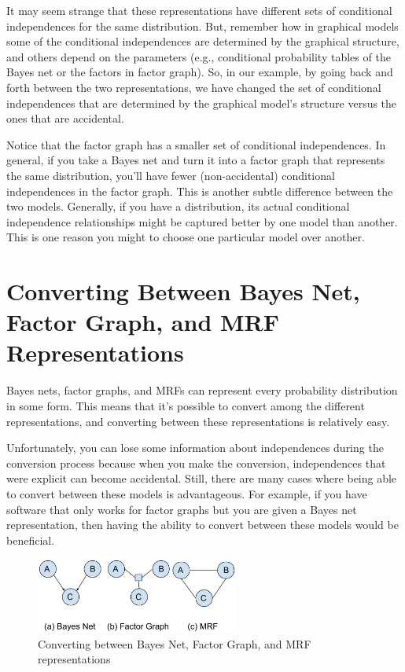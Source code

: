 \documentclass[twoside]{article}
\begin{document}
It may seem strange that these representations have different sets of conditional independences for the same
distribution.
But, remember how in graphical models some of the conditional independences are determined
by the graphical structure, and others depend on the parameters (e.g., conditional probability tables of the Bayes net
or the factors in factor graph).
So, in our example, by going back and forth between the two representations, we have changed the set of 
conditional independences that are determined by the graphical model's structure versus the ones that are accidental.

Notice that the factor graph has a smaller set of conditional independences.
In general, if you take a Bayes net and turn it into a factor graph that represents the same distribution,
you'll have fewer (non-accidental) conditional independences in the factor graph.
This is another subtle difference between the two models.
Generally, if you have a distribution, its actual conditional 
independence relationships might be captured better by one model than another.
This is one reason you might to choose one particular model over another.

\section{Converting Between Bayes Net, Factor Graph, and MRF Representations}
Bayes nets, factor graphs, and MRFs can represent every probability distribution in some form.
This means that it's possible to convert among the different representations, and converting between these representations is relatively easy.

Unfortunately, you can lose some information about independences during the conversion process because
when you make the conversion, independences that were explicit can become accidental.
Still, there are many cases where being able to convert between these models is advantageous.
For example, if you have software that only works for factor graphs but you are given a Bayes net 
representation, then having the ability to convert between these models would be beneficial.

\begin{figure}[h]
\caption{Converting between Bayes Net, Factor Graph, and MRF representations}
\label{fig:f4}
\centering
\includegraphics[width=0.6\textwidth]{conv}
\end{figure}
\end{document}
